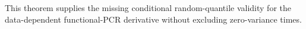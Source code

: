 This theorem supplies the missing conditional random-quantile validity for the data-dependent functional-PCR derivative without excluding zero-variance times.